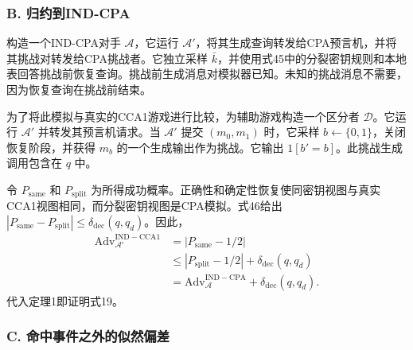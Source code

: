 \subsubsection*{B. 归约到IND-CPA}

构造一个IND-CPA对手 \(\mathcal{A}\)，它运行 \(\mathcal{A}'\)，将其生成查询转发给CPA预言机，并将其挑战对转发给CPA挑战者。它独立采样 \(\bar{k}\)，并使用式45中的分裂密钥规则和本地表回答挑战前恢复查询。挑战前生成消息对模拟器已知。未知的挑战消息不需要，因为恢复查询在挑战前结束。

为了将此模拟与真实的CCA1游戏进行比较，为辅助游戏构造一个区分者 \(\mathcal{D}\)。它运行 \(\mathcal{A}'\) 并转发其预言机请求。当 \(\mathcal{A}'\) 提交 \((m_0, m_1)\) 时，它采样 \(b \leftarrow \{0, 1\}\)，关闭恢复阶段，并获得 \(m_b\) 的一个生成输出作为挑战。它输出 \(1[b' = b]\)。此挑战生成调用包含在 \(q\) 中。

令 \(P_{\mathrm{same}}\) 和 \(P_{\mathrm{split}}\) 为所得成功概率。正确性和确定性恢复使同密钥视图与真实CCA1视图相同，而分裂密钥视图是CPA模拟。式46给出 \(|P_{\mathrm{same}} - P_{\mathrm{split}}| \le \delta_{\mathrm{dec}}(q, q_d)\)。因此，
\begin{equation}
\begin{aligned}
\mathrm{Adv}_{\mathcal{A}'}^{\mathrm{IND-CCA1}} &= |P_{\mathrm{same}} - 1/2| \\
&\le |P_{\mathrm{split}} - 1/2| + \delta_{\mathrm{dec}}(q, q_d) \\
&= \mathrm{Adv}_{\mathcal{A}}^{\mathrm{IND-CPA}} + \delta_{\mathrm{dec}}(q, q_d).
\end{aligned} \tag{47}
\end{equation}
代入定理1即证明式19。

\subsubsection*{C. 命中事件之外的似然偏差}

